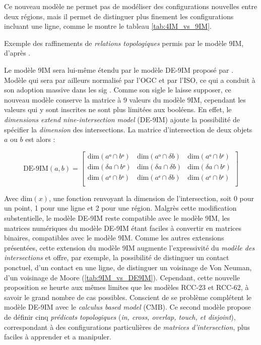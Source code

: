 Ce nouveau modèle ne permet pas de modéliser des configurations
nouvelles entre deux régions, mais il permet de distinguer plus
finement les configurations incluant une ligne, comme le montre le
tableau \ref{tab:4IM_vs_9IM}.

\begin{table}
  \centering
  
  \caption{Exemple des raffinements de \emph{relations topologiques}
    permis par le modèle 9IM, d'après \textcite{Egenhofer2011}.}
  \label{tab:4IM_vs_9IM}
\end{table}

Le modèle 9IM sera lui-même étendu par le modèle DE-9IM proposé par
\textcite{Clementini1993}. Modèle qui sera par ailleurs normalisé par
l'OGC et par l'ISO, ce qui a conduit à son adoption massive dans les
\ac{sig} \autocite{Strobl2008}. Comme son sigle le laisse supposer, ce
nouveau modèle conserve la matrice à 9 valeurs du modèle 9IM,
cependant les valeurs qui y sont inscrites ne sont plus limitées aux
booléens. En effet, le \emph{dimensions extend nine-intersection
  model} (DE-9IM) ajoute la possibilité de spécifier la
\emph{dimension} des intersections. La matrice d'intersection de deux
objets \(a\) ou \(b\) est alors :

\begin{equation}
  \label{eq:matrice_DE9IM}
  \text{DE-9IM}(a,b) =
  \begin{bmatrix}
    \text{dim}(aᵒ ∩ bᵒ)&\text{dim}(aᵒ ∩ δb)&\text{dim}(aᵒ ∩ bᵉ)\\
    \text{dim}(δa ∩ bᵒ)&\text{dim}(δa ∩ δb)&\text{dim}(δa ∩ bᵉ)\\
    \text{dim}(aᵉ ∩ bᵒ)&\text{dim}(aᵉ ∩ δb)&\text{dim}(aᵉ ∩ bᵉ)\\
  \end{bmatrix}
\end{equation}

Avec \(\text{dim}(x)\), une fonction renvoyant la dimension de
l'intersection, soit 0 pour un point, 1 pour une ligne et 2 pour une
région. Malgrès cette modification substentielle, le modèle DE-9IM
reste compatible avec le modèle 9IM, les matrices numériques du modèle
DE-9IM étant faciles à convertir en matrices binaires, compatibles
avec le modèle 9IM. Comme les autres extensions présentées, cette
extension du modèle 9IM augmente l'expressivité du \emph{modèle des
  intersections} et offre, par exemple, la possibilité de distinguer
un contact ponctuel, d'un contact en une ligne, \ie de distinguer un
voisinage de Von Neuman, d'un voisinage de Moore
(\autoref{tab:9IM_vs_DE9IM}). Cependant, cette nouvelle proposition se
heurte aux mêmes limites que les modèles RCC-23 et RCC-62, à savoir le
grand nombre de cas possibles. Conscient de se problème
\textcite{Clementini1993} complétent le modèle DE-9IM avec le
\emph{calculus based model} (CMB). Ce second modèle propose de définir
cinq \emph{prédicats topologiques} (\emph{in, cross, overlap, touch,
  et disjoint}), correspondant à des configurations particulières de
\emph{matrices d'intersection}, plus faciles à apprender et a
manipuler.


